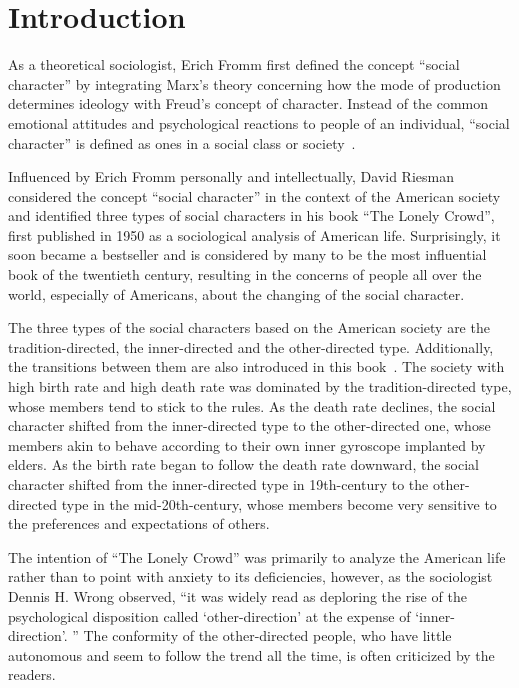 \chapter{Introduction}\label{chp.introduction}

As a theoretical sociologist, Erich Fromm first defined the concept ``social character'' by integrating Marx's theory concerning how the mode of production determines ideology with Freud's concept of character. Instead of the common emotional attitudes and psychological reactions to people of an individual, ``social character'' is defined as ones in a social class or society~\citep{fromm1941escape}. 

Influenced by Erich Fromm personally and intellectually, David Riesman considered the concept ``social character'' in the context of the American society and identified three types of social characters in his book ``The Lonely Crowd'', first published in 1950 as a sociological analysis of American life. Surprisingly, it soon became a bestseller and is considered by many to be the most influential book of the twentieth century, resulting in the concerns of people all over the world, especially of Americans, about the changing of the social character.

The three types of the social characters based on the American society are the tradition-directed, the inner-directed and the other-directed type. Additionally, the transitions between them are also introduced in this book~\citep{riesman2001lonely}. The society with high birth rate and high death rate was dominated by the tradition-directed type, whose members tend to stick to the rules. As the death rate declines, the social character shifted from the inner-directed type to the other-directed one, whose members akin to behave according to their own inner gyroscope implanted by elders. As the birth rate began to follow the death rate downward, the social character shifted from the inner-directed type in 19th-century to the other-directed type in the mid-20th-century, whose members become very sensitive to the preferences and expectations of others.

The intention of ``The Lonely Crowd'' was primarily to analyze the American life rather than to point with anxiety to its deficiencies, however, as the sociologist Dennis H. Wrong observed, ``it was widely read as deploring the rise of the psychological disposition called `other-direction' at the expense of `inner-direction'. '' The conformity of the other-directed people, who have little autonomous and seem to follow the trend all the time, is often criticized by the readers. 

